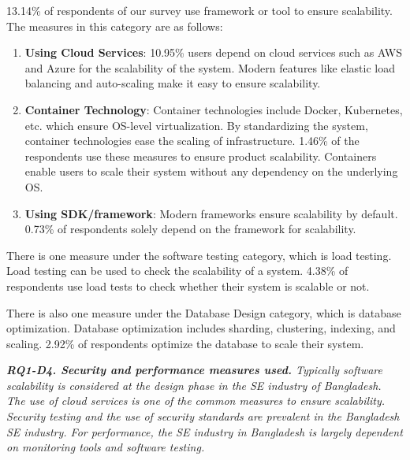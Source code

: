  13.14\% of respondents of our survey use framework or tool to ensure scalability. The measures in this category are as follows:
\begin{enumerate}[label=(\alph*)]

    \item \textbf{Using Cloud Services}: 10.95\% users depend on cloud services such as AWS and Azure for the scalability of the system. Modern features like elastic load balancing and auto-scaling make it easy to ensure scalability.
    
    \item \textbf{Container Technology}: Container technologies include Docker, Kubernetes, etc. which ensure OS-level virtualization. By standardizing the system, container technologies ease the scaling of infrastructure. 1.46\% of the respondents use these measures to ensure product scalability. Containers enable users to scale their system without any dependency on the underlying OS.
    
    \item \textbf{Using SDK/framework}: Modern frameworks ensure scalability by default. 0.73\% of respondents solely depend on the framework for scalability.
  
\end{enumerate}
 
 
There is one measure under the software testing category, which is load testing. Load testing can be used to check the scalability of a system. 4.38\% of respondents use load tests to check whether their system is scalable or not.

There is also one measure under the Database Design category, which is database optimization. Database optimization includes sharding, clustering, indexing, and scaling. 2.92\% of respondents optimize the database to scale their system.
\begin{tcolorbox}[flushleft upper,boxrule=1pt,arc=0pt,left=0pt,right=0pt,top=0pt,bottom=0pt,colback=white,after=\ignorespacesafterend\par\noindent]
\nd\it{\bf{RQ1-D4. Security and performance measures used.}} Typically software scalability is considered at the design phase in the SE industry of Bangladesh. 
The use of cloud services is one of the common measures to ensure scalability. Security testing and the use of security standards are prevalent in the Bangladesh SE industry. 
For performance, the SE industry in Bangladesh is largely dependent on monitoring tools and software testing.
\end{tcolorbox}
